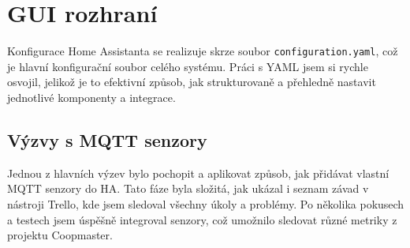 \section{GUI rozhraní}\label{sec:tvorba-gui-rozhrani}

Konfigurace Home Assistanta se realizuje skrze soubor \texttt{configuration.yaml}, což je hlavní konfigurační soubor celého systému.
Práci s YAML jsem si rychle osvojil, jelikož je to efektivní způsob, jak strukturovaně a přehledně nastavit jednotlivé komponenty a integrace.

\subsection*{Výzvy s MQTT senzory}

Jednou z hlavních výzev bylo pochopit a aplikovat způsob, jak přidávat vlastní MQTT senzory do HA. Tato fáze byla složitá, jak ukázal i seznam závad v nástroji Trello, kde jsem sledoval všechny úkoly a problémy.
Po několika pokusech a testech jsem úspěšně integroval senzory, což umožnilo sledovat různé metriky z projektu Coopmaster.

